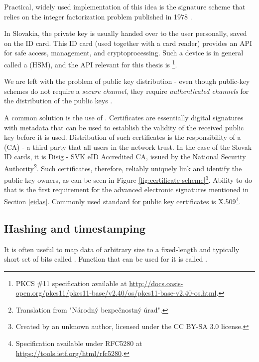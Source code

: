 \documentclass[thesismargins, english, thesislinespacing, onelinechapterstyle, upjsfrontpage]{rnthesis}
\begin{document}
Practical, widely used implementation of this idea is the  signature scheme that relies on the integer factorization problem published in 1978 \cite{rsa}.

In Slovakia, the private key is usually handed over to the user personally, saved on the ID card. This ID card (used together with a card reader) provides an API for safe access, management, and cryptoprocessing.
Such a device is in general called a  (HSM), and the API relevant for this thesis is  \footnote{PKCS \#11 specification available at \url{http://docs.oasis-open.org/pkcs11/pkcs11-base/v2.40/os/pkcs11-base-v2.40-os.html}.}.

We are left with the problem of public key distribution - even though public-key schemes do not require a \textit{secure channel}, they require \textit{authenticated channels} for the distribution of the public keys \cite{cryptotxtbook}.

A common solution is the use of .
Certificates are essentially digital signatures with metadata that can be used to establish the validity of the received public key before it is used.
Distribution of such certificates is the responsibility of a  (CA) - a third party that all users in the network trust.
In the case of the Slovak ID cards, it is Disig - SVK eID Accredited CA, issued by the National Security Authority\footnote{Translation from "Národný bezpečnostný úrad".}.
Such certificates, therefore, reliably uniquely link and identify the public key owners, as can be seen in Figure \ref{fig:certificate-scheme}\footnote{Created by an unknown author, licensed under the CC BY-SA 3.0 license.}.
Ability to do that is the first requirement for the advanced electronic signatures mentioned in Section \ref{eidas}.
Commonly used standard for public key certificates is X.509\footnote{Specification available under RFC5280 at \url{https://tools.ietf.org/html/rfc5280}.}.


\iffalse %
TODO: Mention EU LOTL
\fi

\subsection{Hashing and timestamping}

It is often useful to map data of arbitrary size to a fixed-length and typically short set of bits called .
Function that can be used for it is called .
\end{document}
